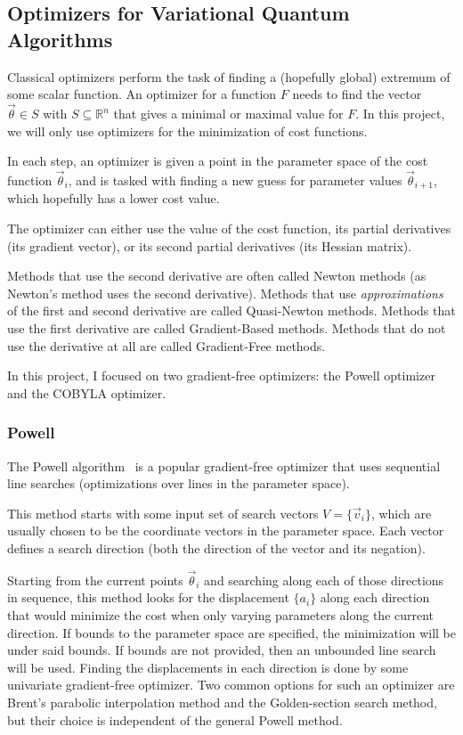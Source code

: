\documentclass[a4paper,12pt]{article}
\newcommand{\thetas}{\vec{\theta}}
\begin{document}
\subsection{Optimizers for Variational Quantum Algorithms} \label{subsec:optimizers}
Classical optimizers perform the task of finding a (hopefully global) extremum of some scalar function.
An optimizer for a function $F$ needs to find the vector $\thetas \in S$ with $S \subseteq \mathbb{R}^n$ that gives a minimal or maximal value for $F$. In this project, we will only use optimizers for the minimization of cost functions.

In each step, an optimizer is given a point in the parameter space of the cost function $\thetas_{i}$, and is tasked with finding a new guess for parameter values $\thetas_{i+1}$, which hopefully has a lower cost value.

The optimizer can either use the value of the cost function, its partial derivatives (its gradient vector), or its second partial derivatives (its Hessian matrix).

Methods that use the second derivative are often called Newton methods (as Newton's method uses the second derivative). Methods that use \emph{approximations} of the first and second derivative are called Quasi-Newton methods.
Methods that use the first derivative are called Gradient-Based methods. Methods that do not use the derivative at all are called Gradient-Free methods.

In this project, I focused on two gradient-free optimizers: the Powell optimizer and the COBYLA optimizer.

\subsubsection{Powell}
The Powell algorithm~\cite{Powell1964} is a popular gradient-free optimizer that uses sequential line searches (optimizations over lines in the parameter space).

This method starts with some input set of search vectors $V = \{\vec{v}_i\}$, which are usually chosen to be the coordinate vectors in the parameter space. Each vector defines a search direction (both the direction of the vector and its negation).

Starting from the current points $\thetas_i$ and searching along each of those directions in sequence, this method looks for the displacement $\{a_i\}$ along each direction that would minimize the cost when only varying parameters along the current direction.
If bounds to the parameter space are specified, the minimization will be under said bounds. If bounds are not provided, then an unbounded line search will be used.
Finding the displacements in each direction is done by some univariate gradient-free optimizer.
Two common options for such an optimizer are Brent's parabolic interpolation method and the Golden-section search method, but their choice is independent of the general Powell method.
\end{document}
